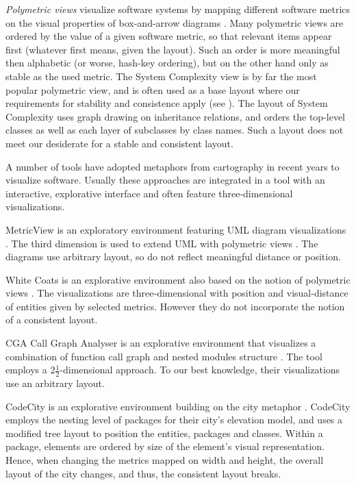\emph{Polymetric views} visualize software systems by mapping different software metrics on the visual properties of box-and-arrow diagrams \cite{Lanz03d,Lanz06a}. Many polymetric views are ordered by the 
value of a given software metric, so that relevant items appear first (whatever first means, given the 
layout). Such an order is more meaningful then alphabetic (or worse, hash-key ordering), but on the other hand only as stable as the used metric. The System Complexity view is by far the most popular polymetric view, and is often used as a base layout where our requirements for stability and consistence apply (see \eg \cite{Gree06a}). The layout of System Complexity uses graph drawing on inheritance relations, and orders the top-level classes as well as each layer of subclasses by class names. Such a layout does not meet our desiderate for a stable and consistent layout.
   
A number of tools have adopted metaphors from cartography in recent years to visualize software.
Usually these approaches are integrated in a tool with an interactive, explorative interface and often feature three-dimensional visualizations.

MetricView is an exploratory environment featuring UML diagram visualizations \cite{Term05a}. The third dimension is used to extend UML with polymetric views \cite{Lanz03d}.
The diagrams use arbitrary layout, so do not reflect meaningful distance or position.

White Coats is an explorative environment also based on the notion of polymetric views \cite{Mesn05b}. The visualizations are three-dimensional with position and visual-distance of entities given by selected metrics. However they do not incorporate the notion of a consistent layout.

CGA Call Graph Analyser is an explorative environment that visualizes a combination of function call graph and nested modules structure \cite{Bohn07a}. The tool employs a 2$\frac{1}{2}$-dimensional approach. To our best knowledge, their visualizations use an arbitrary layout.

CodeCity is an explorative environment building on the city metaphor \cite{Wett07b}. CodeCity employs the nesting level of packages for their city's elevation model, and uses a modified tree layout to position the entities, \ie packages and classes. Within a package, elements are ordered by size of the element's visual representation. Hence, when changing the metrics mapped on width and height, the overall layout of the city changes, and thus, the consistent layout breaks.

